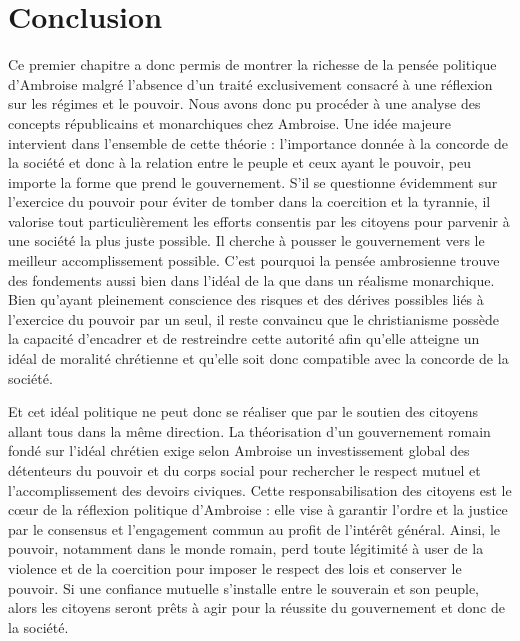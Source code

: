 \section*{Conclusion}

Ce premier chapitre a donc permis de montrer la richesse de la pensée politique d'Ambroise malgré l'absence d'un traité exclusivement consacré à une réflexion sur les régimes et le pouvoir. Nous avons donc pu procéder à une analyse des concepts républicains et monarchiques chez Ambroise. Une idée majeure intervient dans l'ensemble de cette théorie : l'importance donnée à la concorde de la société et donc à la relation entre le peuple et ceux ayant le pouvoir, peu importe la forme que prend le gouvernement. S'il se questionne évidemment sur l'exercice du pouvoir pour éviter de tomber dans la coercition et la tyrannie, il valorise tout particulièrement les efforts consentis par les citoyens pour parvenir à une société la plus juste possible. Il cherche à pousser le gouvernement vers le meilleur accomplissement possible. C'est pourquoi la pensée ambrosienne trouve des fondements aussi bien dans l'idéal de la  que dans un réalisme monarchique. Bien qu'ayant pleinement conscience des risques et des dérives possibles liés à l'exercice du pouvoir par un seul, il reste convaincu que le christianisme possède la capacité d'encadrer et de restreindre cette autorité afin qu'elle atteigne un idéal de moralité chrétienne et qu'elle soit donc compatible avec la concorde de la société.

\bigskip

Et cet idéal politique ne peut donc se réaliser que par le soutien des citoyens allant tous dans la même direction. La théorisation d'un gouvernement romain fondé sur l'idéal chrétien exige selon Ambroise un investissement global des détenteurs du pouvoir et du corps social pour rechercher le respect mutuel et l'accomplissement des devoirs civiques. Cette responsabilisation des citoyens est le cœur de la réflexion politique d'Ambroise : elle vise à garantir l'ordre et la justice par le consensus et l'engagement commun au profit de l'intérêt général. Ainsi, le pouvoir, notamment dans le monde romain, perd toute légitimité à user de la violence et de la coercition pour imposer le respect des lois et conserver le pouvoir. Si une confiance mutuelle s'installe entre le souverain et son peuple, alors les citoyens seront prêts à agir pour la réussite du gouvernement et donc de la société.

\bigskip

